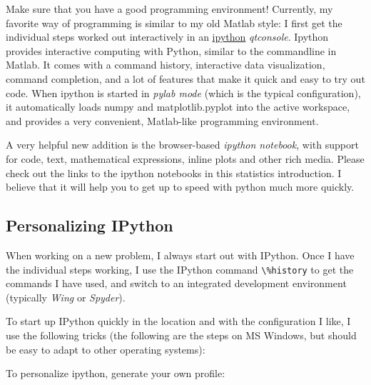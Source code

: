 Make sure that you have a good programming environment! Currently, my favorite way of programming is
similar to my old Matlab style: I first get the individual steps worked out interactively in an
\href{http://ipython.org/}{ipython} \emph{qtconsole}. Ipython  provides interactive computing with Python, similar to the commandline in Matlab. It comes with a command history, interactive data visualization, command completion, and a lot of features that make it quick and easy to try out code. When ipython is started in \emph{pylab mode} (which is the typical configuration), it automatically loads numpy and matplotlib.pyplot into the active workspace, and provides a very convenient, Matlab-like programming environment.

A very helpful new addition is the browser-based \emph{ipython notebook}, with support for code, text, mathematical expressions, inline plots and other rich media. Please check out the links to the ipython
notebooks in this statistics introduction. I believe that it will  help you to get up to speed with python much more quickly.

\subsection{Personalizing IPython}

When working on a new problem, I always start out with IPython. Once I have the individual steps working, I use the IPython command \lstinline{\%history} to get the commands I have used, and switch to an integrated development environment (typically \emph{Wing} or \emph{Spyder}).

To start up IPython quickly in the location and with the configuration I like, I use the following tricks (the following are the steps on MS Windows, but should be easy to adapt to other operating systems):

To personalize ipython, generate your own profile:

